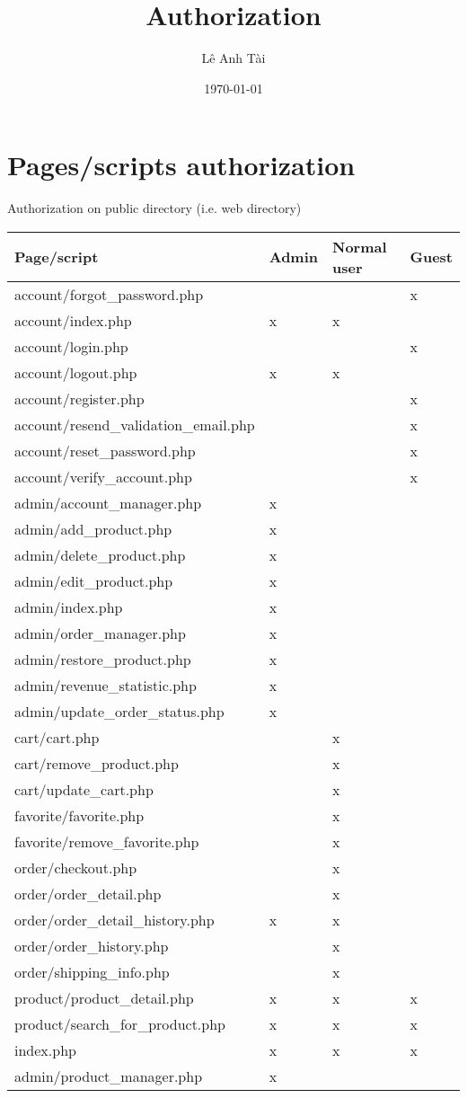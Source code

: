 \documentclass[11pt]{article}
\author{Lê Anh Tài}
\date{\today}
\title{Authorization}
\begin{document}
\maketitle
\tableofcontents

\section{Pages/scripts authorization}
\label{sec:org16726a8}
Authorization on public directory (i.e. web directory)
\begin{center}
\begin{tabular}{llll}
Page/script & Admin & Normal user & Guest\\
\hline
account/forgot\_password.php &  &  & x\\
account/index.php & x & x & \\
account/login.php &  &  & x\\
account/logout.php & x & x & \\
account/register.php &  &  & x\\
account/resend\_validation\_email.php &  &  & x\\
account/reset\_password.php &  &  & x\\
account/verify\_account.php &  &  & x\\
admin/account\_manager.php & x &  & \\
admin/add\_product.php & x &  & \\
admin/delete\_product.php & x &  & \\
admin/edit\_product.php & x &  & \\
admin/index.php & x &  & \\
admin/order\_manager.php & x &  & \\
admin/restore\_product.php & x &  & \\
admin/revenue\_statistic.php & x &  & \\
admin/update\_order\_status.php & x &  & \\
cart/cart.php &  & x & \\
cart/remove\_product.php &  & x & \\
cart/update\_cart.php &  & x & \\
favorite/favorite.php &  & x & \\
favorite/remove\_favorite.php &  & x & \\
order/checkout.php &  & x & \\
order/order\_detail.php &  & x & \\
order/order\_detail\_history.php & x & x & \\
order/order\_history.php &  & x & \\
order/shipping\_info.php &  & x & \\
product/product\_detail.php & x & x & x\\
product/search\_for\_product.php & x & x & x\\
index.php & x & x & x\\
admin/product\_manager.php & x &  & \\
\end{tabular}
\end{center}
\end{document}
